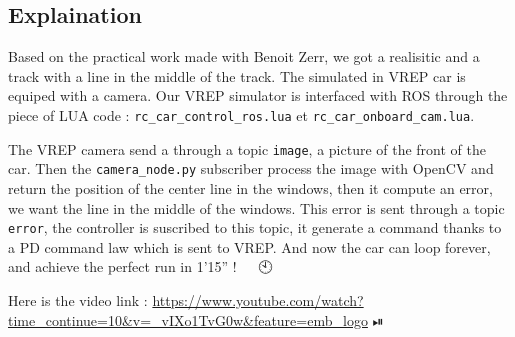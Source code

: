 \subsection{Explaination}

Based on the practical work made with Benoit Zerr, we got a realisitic and a track with a line in the middle of the track.
The simulated in VREP car is equiped with a camera. Our VREP simulator is interfaced with ROS through the piece of LUA code :
\texttt{rc\_car\_control\_ros.lua} et \texttt{rc\_car\_onboard\_cam.lua}.

The VREP camera send a through a topic \texttt{image}, a picture of the front of the car. 
Then the \texttt{camera\_node.py} subscriber process the image with OpenCV and return the position
of the center line in the windows, then it compute an error, we want the line in the middle of the windows. 
This error is sent through a topic \texttt{error}, the controller is suscribed to this topic,
it generate a command thanks to a PD command law which is sent to VREP. And now the car can loop forever, and achieve 
the perfect run in 1'15'' ! 🚙 🏁 🕙


Here is the video link : \url{https://www.youtube.com/watch?time_continue=10&v=_vIXo1TvG0w&feature=emb_logo} ⏯

